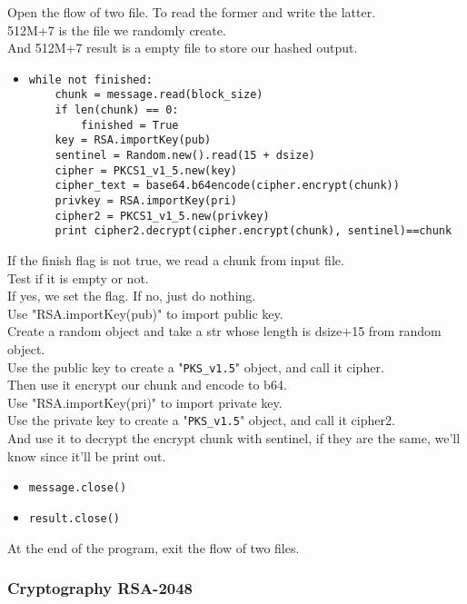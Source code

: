 \documentclass{article}
\begin{document}
\noindent Open the flow of two file. To read the former and write the latter.\\
512M+7 is the file we randomly create.\\
And 512M+7 result is a empty file to store our hashed output.

\begin{itemize}
\item \begin{verbatim}while not finished:
    chunk = message.read(block_size)
    if len(chunk) == 0:
        finished = True
    key = RSA.importKey(pub)
    sentinel = Random.new().read(15 + dsize)
    cipher = PKCS1_v1_5.new(key)
    cipher_text = base64.b64encode(cipher.encrypt(chunk))
    privkey = RSA.importKey(pri)
    cipher2 = PKCS1_v1_5.new(privkey)
    print cipher2.decrypt(cipher.encrypt(chunk), sentinel)==chunk
\end{verbatim}
\end{itemize}

\noindent If the finish flag is not true, we read a chunk from input file.\\
Test if it is empty or not.\\
If yes, we set the flag. If no, just do nothing.\\
Use "RSA.importKey(pub)" to import public key.\\
Create a random object and take a str whose length is dsize+15 from random object.\\
Use the public key to create a "\verb|PKS_v1.5|" object, and call it cipher.\\
Then use it encrypt our chunk and encode to b64.\\
Use "RSA.importKey(pri)" to import private key.\\
Use the private key to create a "\verb|PKS_v1.5|" object, and call it cipher2.\\
And use it to decrypt the encrypt chunk with sentinel, if they are the same, we'll know since it'll be print out.

\begin{itemize}
\item \verb|message.close()|
\item \verb|result.close()|
\end{itemize}

\noindent At the end of the program, exit the flow of two files.\\

\subsubsection{Cryptography RSA-2048}
\end{document}
